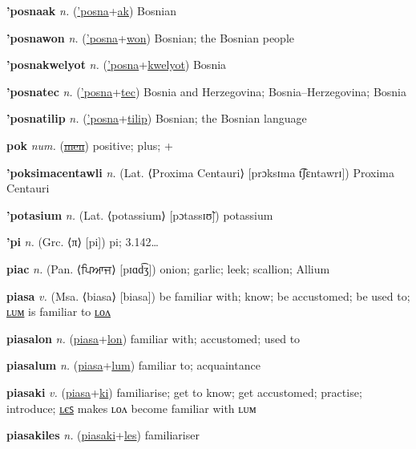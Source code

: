 \textbf{\hypertarget{'posnaak}{'posnaak}} \textit{n.} (\hyperlink{'posna}{'posna}+\allowbreak \hyperlink{ak}{ak})
Bosnian

\textbf{\hypertarget{'posnawon}{'posnawon}} \textit{n.} (\hyperlink{'posna}{'posna}+\allowbreak \hyperlink{won}{won})
Bosnian; the Bosnian people

\textbf{\hypertarget{'posnakwelyot}{'posnakwelyot}} \textit{n.} (\hyperlink{'posna}{'posna}+\allowbreak \hyperlink{kwelyot}{kwelyot})
Bosnia

\textbf{\hypertarget{'posnatec}{'posnatec}} \textit{n.} (\hyperlink{'posna}{'posna}+\allowbreak \hyperlink{tec}{tec})
Bosnia and Herzegovina; Bosnia–Herzegovina; Bosnia

\textbf{\hypertarget{'posnatilip}{'posnatilip}} \textit{n.} (\hyperlink{'posna}{'posna}+\allowbreak \hyperlink{tilip}{tilip})
Bosnian; the Bosnian language

\textbf{\hypertarget{pok}{pok}} \textit{num.} (\hyperlink{men}{\sout{men}})
positive; plus; +\allowbreak 

\textbf{\hypertarget{'poksimacentawli}{'poksimacentawli}} \textit{n.} (Lat. ⟨Proxima Centauri⟩ [prɔksɪma t͡ʃɛntawrɪ])
Proxima Centauri

\textbf{\hypertarget{'potasium}{'potasium}} \textit{n.} (Lat. ⟨potassium⟩ [pɔtassɪʊ̃])
potassium

\textbf{\hypertarget{'pi}{'pi}} \textit{n.} (Grc. ⟨π⟩ [pi])
pi; 3.142…

\textbf{\hypertarget{piac}{piac}} \textit{n.} (Pan. ⟨{\gurmukhi{}ਪਿਆਜ}⟩ [pɪɑd͡ʒ])
onion; garlic; leek; scallion; Allium

\textbf{\hypertarget{piasa}{piasa}} \textit{v.} (Msa. ⟨biasa⟩ [biasa])
be familiar with; know; be accustomed; be used to; \hyperlink{piasalum}{ʟᴜᴍ} is familiar to \hyperlink{piasalon}{ʟᴏᴧ}

\textbf{\hypertarget{piasalon}{piasalon}} \textit{n.} (\hyperlink{piasa}{piasa}+\allowbreak \hyperlink{lon}{lon})
familiar with; accustomed; used to

\textbf{\hypertarget{piasalum}{piasalum}} \textit{n.} (\hyperlink{piasa}{piasa}+\allowbreak \hyperlink{lum}{lum})
familiar to; acquaintance

\textbf{\hypertarget{piasaki}{piasaki}} \textit{v.} (\hyperlink{piasa}{piasa}+\allowbreak \hyperlink{ki}{ki})
familiarise; get to know; get accustomed; practise; introduce; \hyperlink{piasakiles}{ʟєꜱ} makes ʟᴏᴧ become familiar with ʟᴜᴍ

\textbf{\hypertarget{piasakiles}{piasakiles}} \textit{n.} (\hyperlink{piasaki}{piasaki}+\allowbreak \hyperlink{les}{les})
familiariser

